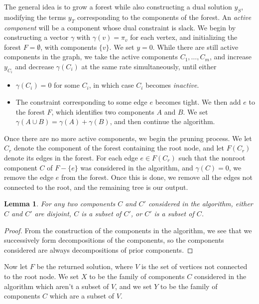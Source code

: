 \documentclass{article}
\theoremstyle{plain}
\newtheorem{lemma}{Lemma}
\begin{document}
The general idea is to grow a forest while also constructing a dual solution $y_S$, modifying the terms $y_T$ corresponding to the components of the forest. An {\it active component} will be a component whose dual constraint is slack. We begin by constructing a vector $\gamma$ with $\gamma(v) = \pi_v$ for each vertex, and initializing the forest $F = \emptyset$, with components $\{ v \}$. We set $y = 0$. While there are still active components in the graph, we take the active components $C_1, \dots, C_m$, and increase $y_{C_i}$ and decrease $\gamma(C_i)$ at the same rate simultaneously, until either
%
\begin{itemize}
    \item $\gamma(C_i) = 0$ for some $C_i$, in which case $C_i$ becomes {\it inactive}.
    \item The constraint corresponding to some edge $e$ becomes tight. We then add $e$ to the forest $F$, which identifies two components $A$ and $B$. We set $\gamma(A \cup B) = \gamma(A) + \gamma(B)$, and then continue the algorithm.
\end{itemize}
%
Once there are no more active components, we begin the pruning process. We let $C_r$ denote the component of the forest containing the root node, and let $F(C_r)$ denote its edges in the forest. For each edge $e \in F(C_r)$ such that the nonroot component $C$ of $F - \{ e \}$ was considered in the algorithm, and $\gamma(C) = 0$, we remove the edge $e$ from the forest. Once this is done, we remove all the edges not connected to the root, and the remaining tree is our output.

\begin{lemma}
    For any two components $C$ and $C'$ considered in the algorithm, either $C$ and $C'$ are disjoint, $C$ is a subset of $C'$, or $C'$ is a subset of $C$.
\end{lemma}
\begin{proof}
    From the construction of the components in the algorithm, we see that we successively form decompositions of the components, so the components considered are always decompositions of prior components.
\end{proof}

Now let $F$ be the returned solution, where $V$ is the set of vertices not connected to the root node. We set $X$ to be the family of components $C$ considered in the algorithm which aren't a subset of $V$, and we set $Y$ to be the family of components $C$ which are a subset of $V$.
\end{document}
